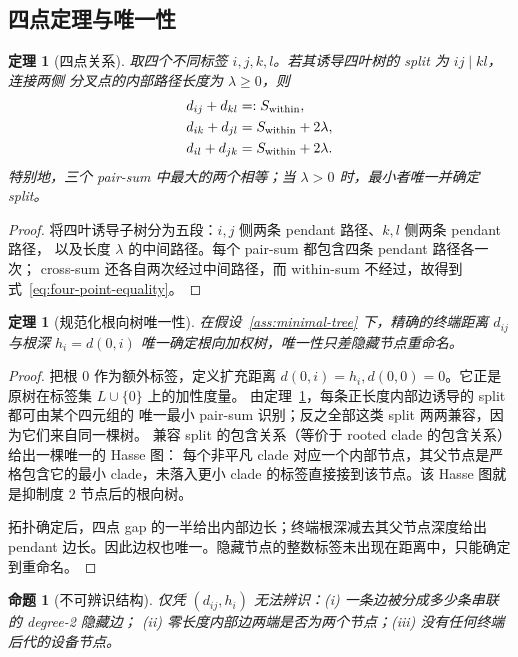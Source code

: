 \documentclass[UTF8,11pt]{ctexart}
\newtheorem{theorem}[definition]{定理}
\newtheorem{proposition}[definition]{命题}
\begin{document}
\subsection{四点定理与唯一性}

\begin{theorem}[四点关系]
\label{thm:four-point}
取四个不同标签 $i,j,k,l$。若其诱导四叶树的 split 为 $ij\mid kl$，连接两侧
分叉点的内部路径长度为 $\lambda\ge0$，则
\begin{align}
 d_{ij}+d_{kl}&=:S_{\rm within},\\
 d_{ik}+d_{jl}&=S_{\rm within}+2\lambda,\\
 d_{il}+d_{jk}&=S_{\rm within}+2\lambda.
 \label{eq:four-point-equality}
\end{align}
特别地，三个 pair-sum 中最大的两个相等；当 $\lambda>0$ 时，最小者唯一并确定 split。
\end{theorem}

\begin{proof}
将四叶诱导子树分为五段：$i,j$ 侧两条 pendant 路径、$k,l$ 侧两条 pendant 路径，
以及长度 $\lambda$ 的中间路径。每个 pair-sum 都包含四条 pendant 路径各一次；
cross-sum 还各自两次经过中间路径，而 within-sum 不经过，故得到
式~\eqref{eq:four-point-equality}。
\end{proof}

\begin{theorem}[规范化根向树唯一性]
\label{thm:tree-uniqueness}
在假设~\ref{ass:minimal-tree} 下，精确的终端距离 $d_{ij}$ 与根深 $h_i=d(0,i)$
唯一确定根向加权树，唯一性只差隐藏节点重命名。
\end{theorem}

\begin{proof}
把根 $0$ 作为额外标签，定义扩充距离
$d(0,i)=h_i,d(0,0)=0$。它正是原树在标签集 $L\cup\{0\}$ 上的加性度量。
由定理~\ref{thm:four-point}，每条正长度内部边诱导的 split 都可由某个四元组的
唯一最小 pair-sum 识别；反之全部这类 split 两两兼容，因为它们来自同一棵树。
兼容 split 的包含关系（等价于 rooted clade 的包含关系）给出一棵唯一的 Hasse 图：
每个非平凡 clade 对应一个内部节点，其父节点是严格包含它的最小 clade，未落入更小
clade 的标签直接接到该节点。该 Hasse 图就是抑制度 $2$ 节点后的根向树。

拓扑确定后，四点 gap 的一半给出内部边长；终端根深减去其父节点深度给出 pendant
边长。因此边权也唯一。隐藏节点的整数标签未出现在距离中，只能确定到重命名。
\end{proof}

\begin{proposition}[不可辨识结构]
\label{prop:nonidentifiable}
仅凭 $(d_{ij},h_i)$ 无法辨识：(i) 一条边被分成多少条串联的 degree-2 隐藏边；
(ii) 零长度内部边两端是否为两个节点；(iii) 没有任何终端后代的设备节点。
\end{proposition}
\end{document}
